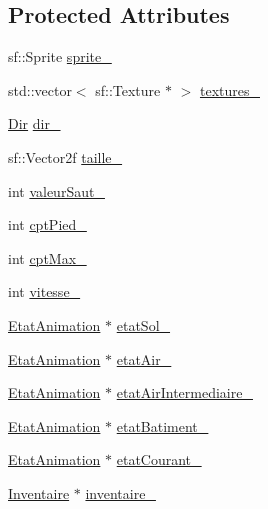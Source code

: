 \subsection*{Protected Attributes}
\begin{DoxyCompactItemize}
\item 
sf\-::\-Sprite \hyperlink{classPersonnage_a2ead6ffe2f28cad6f35f22a411d057d6}{sprite\-\_\-}
\item 
std\-::vector$<$ sf\-::\-Texture $\ast$ $>$ \hyperlink{classPersonnage_a3a1d39c8f1d80a800cafc7fc34e5b578}{textures\-\_\-}
\item 
\hyperlink{Espace_8h_a7cf6e8c5a5bc5e7b2afef3647870b1c4}{Dir} \hyperlink{classPersonnage_aa125be5384227832c1289f23cd21e3b9}{dir\-\_\-}
\item 
sf\-::\-Vector2f \hyperlink{classPersonnage_ad9e9c1c2a9d317e9502f3ba5f8e5e7d9}{taille\-\_\-}
\item 
int \hyperlink{classPersonnage_a5a90b56d0e845fc46f670eb1451facbc}{valeur\-Saut\-\_\-}
\item 
int \hyperlink{classPersonnage_aa6e11d0b6c10c588c31b239e3fc7f7bf}{cpt\-Pied\-\_\-}
\item 
int \hyperlink{classPersonnage_a03257f632724ecf780c246ffd6d4b607}{cpt\-Max\-\_\-}
\item 
int \hyperlink{classPersonnage_aa9527d7da2c71782a3cc222cf54d2ef4}{vitesse\-\_\-}
\item 
\hyperlink{classEtatAnimation}{Etat\-Animation} $\ast$ \hyperlink{classPersonnage_adb14823c721de74a21f1d2cf81a21afe}{etat\-Sol\-\_\-}
\item 
\hyperlink{classEtatAnimation}{Etat\-Animation} $\ast$ \hyperlink{classPersonnage_a8009b989cc0b81a13e51cbe6c9a6aa57}{etat\-Air\-\_\-}
\item 
\hyperlink{classEtatAnimation}{Etat\-Animation} $\ast$ \hyperlink{classPersonnage_af8486012a3832c816fdd472ea12e5d7e}{etat\-Air\-Intermediaire\-\_\-}
\item 
\hyperlink{classEtatAnimation}{Etat\-Animation} $\ast$ \hyperlink{classPersonnage_a0fe6bd498f59727fc05660072f76692e}{etat\-Batiment\-\_\-}
\item 
\hyperlink{classEtatAnimation}{Etat\-Animation} $\ast$ \hyperlink{classPersonnage_ad5595cd1429d9530f1cd5bc91e9ce3f5}{etat\-Courant\-\_\-}
\item 
\hyperlink{classInventaire}{Inventaire} $\ast$ \hyperlink{classPersonnage_ae340ea617523029180a0556789f5e38d}{inventaire\-\_\-}
\end{DoxyCompactItemize}


